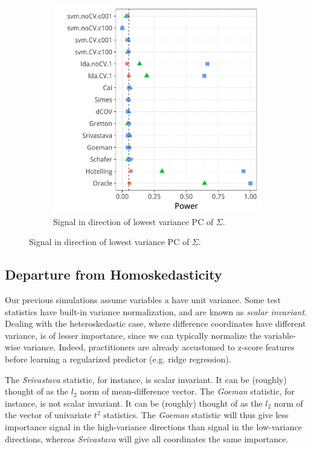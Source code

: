 \documentclass[journal]{IEEEtran}
\begin{document}
\begin{figure}[h]
\begin{subfigure}[t]{.45\columnwidth}
		\includegraphics[width=1\columnwidth]{"art/file17"}
		\caption{Signal in direction of lowest variance PC of $\Sigma$.} 
		\label{fig:dependence_32}
	\end{subfigure}
\end{figure}



\subsection{Departure from Homoskedasticity}

Our previous simulations assume variables a have unit variance. 
Some test statistics have built-in variance normalization, and are known as \emph{scalar invariant}. 
Dealing with the heteroskedastic case, where difference coordinates have different variance, is of lesser importance, since we can typically normalize the variable-wise variance. 
Indeed, practitioners are already accustomed to z-score features before learning a regularized predictor (e.g. ridge regression).

The \emph{Srivastava} statistic, for instance, is scalar invariant. 
It can be (roughly) thought of as the $l_2$ norm of mean-difference vector.
The \emph{Goeman} statistic, for instance, is not scalar invariant. 
It can be (roughly) thought of as the $l_2$ norm of the vector of univariate $t^2$ statistics.
The \emph{Goeman} statistic will thus give less importance signal in the high-variance directions than signal in the low-variance directions, whereas \emph{Srivastava} will give all coordinates the same importance. 
\end{document}
